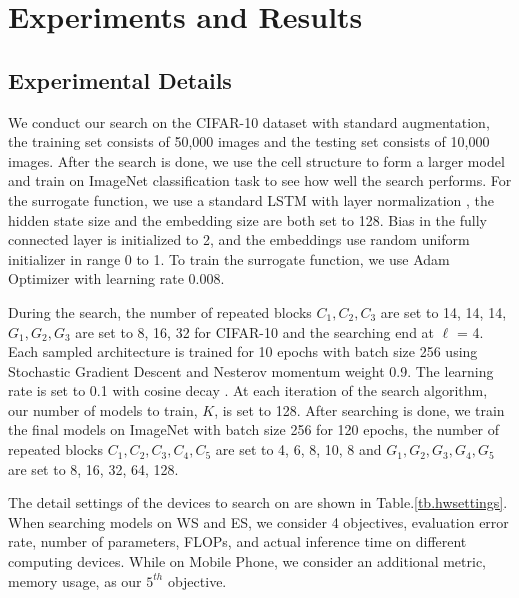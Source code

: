 \documentclass[runningheads]{llncs}
\begin{document}
\section{Experiments and Results}\subsection{Experimental Details}
We conduct our search on the CIFAR-10 dataset with standard augmentation, the training set consists of 50,000 images and the testing set consists of 10,000 images. After the search is done, we use the cell structure to form a larger model and train on ImageNet \cite{deng2009imagenet} classification task to see how well the search performs. For the surrogate function, we use a standard LSTM with layer normalization \cite{ba2016layer}, the hidden state size and the embedding size are both set to 128. Bias in the fully connected layer is initialized to 2, and the embeddings use random uniform initializer in range 0 to 1. To train the surrogate function, we use Adam Optimizer \cite{kingma2014adam} with learning rate 0.008.

During the search, the number of repeated blocks $C_1, C_2, C_3$ are set to 14, 14, 14, $G_1, G_2, G_3$ are set to 8, 16, 32 for CIFAR-10 and the searching end at $\ell$ = 4. Each sampled architecture is trained for 10 epochs with batch size 256 using Stochastic Gradient Descent and Nesterov momentum weight 0.9. The learning rate is set to 0.1 with cosine decay \cite{loshchilov2016sgdr}. At each iteration of the search algorithm, our number of models to train, $K$, is set to 128. After searching is done, we train the final models on ImageNet with batch size 256 for 120 epochs, the number of repeated blocks $C_1, C_2, C_3, C_4, C_5$ are set to 4, 6, 8, 10, 8 and $G_1, G_2, G_3, G_4, G_5$ are set to 8, 16, 32, 64, 128.

The detail settings of the devices to search on are shown in Table.\ref{tb.hwsettings}. When searching models on WS and ES, we consider 4 objectives, evaluation error rate, number of parameters, FLOPs, and actual inference time on different computing devices. While on Mobile Phone, we consider an additional metric, memory usage, as our $5^{th}$ objective.
\end{document}
